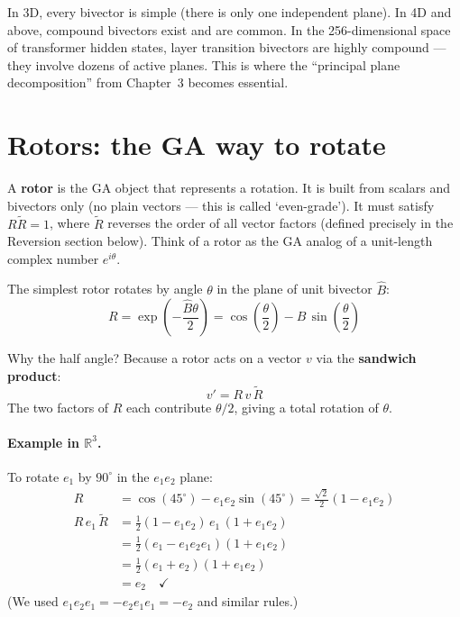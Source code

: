 \documentclass[11pt, twoside, openright]{memoir}
\newcommand{\rev}[1]{\widetilde{#1}} %
\numberwithin{equation}{chapter}
\begin{document}
In 3D, every bivector is simple (there is only one independent plane).
In 4D and above, compound bivectors exist and are common.  In the
256-dimensional space of transformer hidden states, layer transition
bivectors are highly compound --- they involve dozens of active planes.
This is where the ``principal plane decomposition'' from Chapter~3
becomes essential.

\section{Rotors: the GA way to rotate}

A \textbf{rotor} is the GA object that represents a rotation. It is built from scalars and bivectors only (no plain vectors --- this is called `even-grade'). It must satisfy $R\widetilde{R} = 1$, where $\widetilde{R}$ reverses the order of all vector factors (defined precisely in the Reversion section below). Think of a rotor as the GA analog of a unit-length complex number $e^{i\theta}$.

The simplest rotor rotates by angle $\theta$ in the plane of unit
bivector $\hat{B}$:
\begin{equation}
  R = \exp\!\left(-\frac{\hat{B}\theta}{2}\right)
    = \cos\!\left(\frac{\theta}{2}\right)
    - \hat{B}\,\sin\!\left(\frac{\theta}{2}\right)
\end{equation}

Why the half angle?  Because a rotor acts on a vector $v$ via the
\textbf{sandwich product}:
\begin{equation}
  v' = R \, v \, \rev{R}
\end{equation}
The two factors of $R$ each contribute $\theta/2$, giving a total
rotation of $\theta$.

\paragraph{Example in $\mathbb{R}^3$.}
To rotate $e_1$ by $90^\circ$ in the $e_1 e_2$ plane:
\begin{align}
  R &= \cos(45^\circ) - e_1 e_2 \sin(45^\circ)
     = \frac{\sqrt{2}}{2}(1 - e_1 e_2) \\
  R \, e_1 \, \rev{R}
    &= \frac{1}{2}(1 - e_1 e_2)\, e_1 \,(1 + e_1 e_2) \\
    &= \frac{1}{2}(e_1 - e_1 e_2 e_1)(1 + e_1 e_2) \\
    &= \frac{1}{2}(e_1 + e_2)(1 + e_1 e_2) \\
    &= e_2 \quad \checkmark
\end{align}
(We used $e_1 e_2 e_1 = -e_2 e_1 e_1 = -e_2$ and similar rules.)
\end{document}
